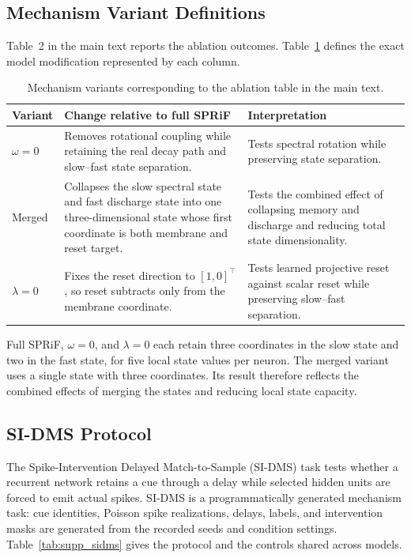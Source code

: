 \documentclass[letterpaper]{article}
\begin{document}
\subsection{Mechanism Variant Definitions}
\label{supp:sec:variant-definitions}

Table~2 in the main text reports the ablation outcomes. Table~\ref{tab:supp_variant_defs} defines the exact model modification represented by each column.

\begin{table}[tbp]
\centering
\small
\setlength{\tabcolsep}{4pt}
\begin{tabular}{p{}p{}p{}}
\toprule
Variant & Change relative to full SPRiF & Interpretation \\
\midrule
$\omega=0$ & Removes rotational coupling while retaining the real decay path and slow--fast state separation. & Tests spectral rotation while preserving state separation. \\
\midrule
Merged & Collapses the slow spectral state and fast discharge state into one three-dimensional state whose first coordinate is both membrane and reset target. & Tests the combined effect of collapsing memory and discharge and reducing total state dimensionality. \\
\midrule
$\lambda=0$ & Fixes the reset direction to $[1,0]^\top$, so reset subtracts only from the membrane coordinate. & Tests learned projective reset against scalar reset while preserving slow--fast separation. \\
\bottomrule
\end{tabular}
\caption{Mechanism variants corresponding to the ablation table in the main text.}
\label{tab:supp_variant_defs}
\end{table}

Full SPRiF, $\omega=0$, and $\lambda=0$ each retain three coordinates in the slow state and two in the fast state, for five local state values per neuron. The merged variant uses a single state with three coordinates. Its result therefore reflects the combined effects of merging the states and reducing local state capacity.

\subsection{SI-DMS Protocol}
\label{supp:sec:sidms-protocol}

The Spike-Intervention Delayed Match-to-Sample (SI-DMS) task tests whether a recurrent network retains a cue through a delay while selected hidden units are forced to emit actual spikes. SI-DMS is a programmatically generated mechanism task: cue identities, Poisson spike realizations, delays, labels, and intervention masks are generated from the recorded seeds and condition settings. Table~\ref{tab:supp_sidms} gives the protocol and the controls shared across models.
\end{document}
